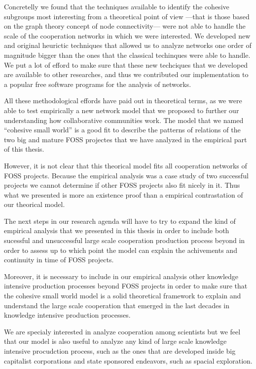 Concretelly we found that the techniques available to identify the cohesive subgroups most interesting from a theoretical point of view ---that is those based on the graph theory concept of node connectivity--- were not able to handle the scale of the cooperation networks in which we were interested. We developed new and original heurictic techniques that allowed us to analyze networks one order of magnitude bigger than the ones that the classical techinques were able to handle. We put a lot of efford to make sure that these new techciques that we developed are available to other researches, and thus we contributed our implementation to a popular free software programs for the analysis of networks.

All these methodological effords have paid out in theoretical terms, as we were able to test empirically a new network model that we proposed to further our understanding how collaborative communities work. The model that we named ``cohesive small world'' is a good fit to describe the patterns of relations of the two big and mature FOSS projectes that we have analyzed in the empirical part of this thesis.

However, it is not clear that this theorical model fits all cooperation networks of FOSS projects. Because the empirical analysis was a case study of two successful projects we cannot determine if other FOSS projects also fit nicely in it. Thus what we presented is more an existence proof than a empirical contrastation of our theorical model.

The next steps in our research agenda will have to try to expand the kind of empirical analysis that we presented in this thesis in order to include both sucessful and unsuccessful large scale cooperation production process beyond in order to assess up to which point the model can explain the achivements and continuity in time of FOSS projects.

Moreover, it is necessary to include in our empirical analysis other knowledge intensive production processes beyond FOSS projects in order to make sure that the cohesive small world model is a solid theoretical framework to explain and understand the large scale cooperation that emerged in the last decades in knowledge intensive production processes.

We are specialy interested in analyze cooperation among scientists but we feel that our model is also useful to analyze any kind of large scale knowledge intensive procudction process, such as the ones that are developed inside big capitalist corporations and state sponsored endeavors, such as spacial exploration. 

